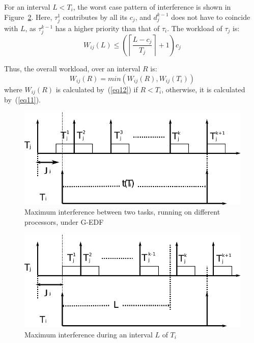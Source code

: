 \documentclass[12pt,english]{report}
\begin{document}
For an interval $L<T_{i}$, the worst case pattern of interference is shown in Figure~\ref{fig2}. Here, $\tau_{j}^{1}$ contributes by all its $c_j$, and $d_j^{k-1}$ does not have to coincide with $L$, as $\tau_j^{k-1}$ has a higher priority than that of $\tau_{i}$. The workload of $\tau_{j}$ is:
\begin{equation}
W_{ij}\left(L\right)\le \left(\left\lceil\frac{L-c_{j}}{T_{j}}\right\rceil +1\right)c_{j}
\label{eq12}\end{equation}

Thus, the overall workload, over an interval $R$ is:
\begin{equation}
W_{ij}\left(R\right)=min\left(W_{ij}\left(R\right),W_{ij}\left(T_{i}\right)\right)\label{eq13}\end{equation}
where $W_{ij}(R)$ is calculated by~(\ref{eq12}) if $R<T_i$, otherwise, it is calculated by~(\ref{eq11}).

\begin{figure}%
\centering
\includegraphics[bb=0bp 0bp 542bp 162bp,scale=0.5]{figures/figure9-a}
\caption{\label{fig1} Maximum interference between two tasks, running on different processors, under G-EDF}
\end{figure}


\begin{figure}
\centering
\includegraphics[bb=0bp 0bp 542bp 162bp,scale=0.5]{figures/figure9-b}
\caption{\label{fig2}Maximum interference during an interval $L$ of $T_{i}$}
\end{figure}
\end{document}
